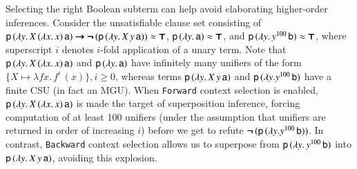 \begin{exa}
  Selecting the right Boolean subterm can help avoid elaborating
  high\-er-order inferences. Consider the unsatisfiable clause set consisting of $\mathsf{p} \, (\lambda y.\, X
  \, (\lambda x.\, x) \, \mathsf{a}) \pmb{\rightarrow}\allowbreak \pmb{\neg\,}(\mathsf{p} \, (\lambda y. \allowbreak\, X
  \, y \, \mathsf{a})) \approx \pmb{\top}$, $\mathsf{p} \, (\lambda y.\, \mathsf{a}) \approx \pmb{\top}$, and
  $\mathsf{p} \, (\lambda y. \, y^{100} \, \mathsf{b}) \approx \pmb{\top}$, where superscript $i$ denotes $i$-fold
  application of a unary term.
  Note that $\mathsf{p} \, (\lambda y.\, X
  \, (\lambda x.\, x) \, \mathsf{a})$ and $\mathsf{p} \,
  (\lambda y.\, \mathsf{a})$ have infinitely many unifiers of the form $\{ X \mapsto \lambda fx.
  \, f^i\, (x) \}, i \geq 0$, whereas terms $\mathsf{p} \, (\lambda y. \, X
  \, y \, \mathsf{a})$ and $\mathsf{p} \, (\lambda y. y^{100} \, \mathsf{b})$ have a finite CSU (in fact an MGU). 
  When \texttt{Forward} context selection is enabled, %
  $\mathsf{p} \, (\lambda y.\, X \, (\lambda x.\, x) \, \mathsf{a})$ is made the target of superposition inference, 
  forcing computation of at least 100 unifiers (under the assumption that
  unifiers are returned in order of increasing $i$) before we get to refute
  $\pmb{\neg\,}(\mathsf{p} \, (\lambda y. y^{100} \, \mathsf{b}))$.
  In contrast, \texttt{Backward} context selection allows us to
  superpose from $\mathsf{p} \, (\lambda y. \, y^{100} \, \mathsf{b})$ into $\mathsf{p} \, (\lambda y. \, X
  \, y \, \mathsf{a})$, avoiding this explosion. 
\end{exa}



